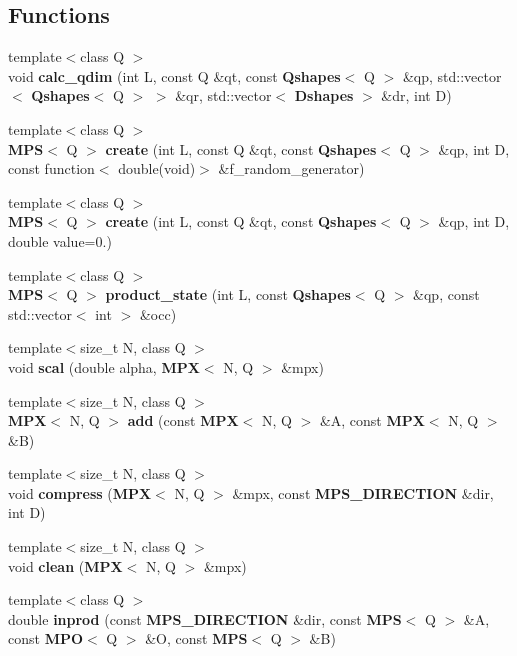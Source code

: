 \subsection*{Functions}
\begin{DoxyCompactItemize}
\item 
{\footnotesize template$<$class Q $>$ }\\void {\bf calc\-\_\-qdim} (int L, const Q \&qt, const {\bf Qshapes}$<$ Q $>$ \&qp, std\-::vector$<$ {\bf Qshapes}$<$ Q $>$ $>$ \&qr, std\-::vector$<$ {\bf Dshapes} $>$ \&dr, int D)
\item 
{\footnotesize template$<$class Q $>$ }\\{\bf M\-P\-S}$<$ Q $>$ {\bf create} (int L, const Q \&qt, const {\bf Qshapes}$<$ Q $>$ \&qp, int D, const function$<$ double(void)$>$ \&f\-\_\-random\-\_\-generator)
\item 
{\footnotesize template$<$class Q $>$ }\\{\bf M\-P\-S}$<$ Q $>$ {\bf create} (int L, const Q \&qt, const {\bf Qshapes}$<$ Q $>$ \&qp, int D, double value=0.)
\item 
{\footnotesize template$<$class Q $>$ }\\{\bf M\-P\-S}$<$ Q $>$ {\bf product\-\_\-state} (int L, const {\bf Qshapes}$<$ Q $>$ \&qp, const std\-::vector$<$ int $>$ \&occ)
\item 
{\footnotesize template$<$size\-\_\-t N, class Q $>$ }\\void {\bf scal} (double alpha, {\bf M\-P\-X}$<$ N, Q $>$ \&mpx)
\item 
{\footnotesize template$<$size\-\_\-t N, class Q $>$ }\\{\bf M\-P\-X}$<$ N, Q $>$ {\bf add} (const {\bf M\-P\-X}$<$ N, Q $>$ \&A, const {\bf M\-P\-X}$<$ N, Q $>$ \&B)
\item 
{\footnotesize template$<$size\-\_\-t N, class Q $>$ }\\void {\bf compress} ({\bf M\-P\-X}$<$ N, Q $>$ \&mpx, const {\bf M\-P\-S\-\_\-\-D\-I\-R\-E\-C\-T\-I\-O\-N} \&dir, int D)
\item 
{\footnotesize template$<$size\-\_\-t N, class Q $>$ }\\void {\bf clean} ({\bf M\-P\-X}$<$ N, Q $>$ \&mpx)
\item 
{\footnotesize template$<$class Q $>$ }\\double {\bf inprod} (const {\bf M\-P\-S\-\_\-\-D\-I\-R\-E\-C\-T\-I\-O\-N} \&dir, const {\bf M\-P\-S}$<$ Q $>$ \&A, const {\bf M\-P\-O}$<$ Q $>$ \&O, const {\bf M\-P\-S}$<$ Q $>$ \&B)
\item 

\end{DoxyCompactItemize}
